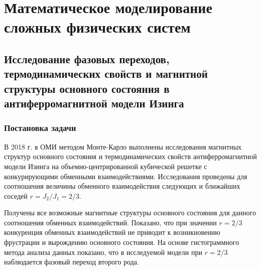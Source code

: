 \chapter{Математическое моделирование сложных физических систем}



\section{Исследование фазовых переходов, термодинамических свойств и магнитной структуры
основного состояния в антиферромагнитной модели Изинга}


\subsection{Постановка задачи}

В 2018 г. в ОМИ методом Монте-Карло выполнены исследования магнитных структур основного состояния и термодинамических свойств антиферромагнитной модели Изинга на объемно-центрированной кубической решетке с конкурирующими обменными взаимодействиями. Исследования проведены для соотношения величины обменного взаимодействия следующих и ближайших соседей $r=J_2/J_1=2/3$.

Получены все возможные магнитные структуры основного состояния для данного соотношения обменных взаимодействий. Показано, что при значении $r=2/3$ конкуренция обменных взаимодействий не приводит к возникновению фрустрации и вырождению основного состояния. На основе гистограммного метода анализа данных показано, что в исследуемой модели при $r=2/3$ наблюдается фазовый переход второго рода.




